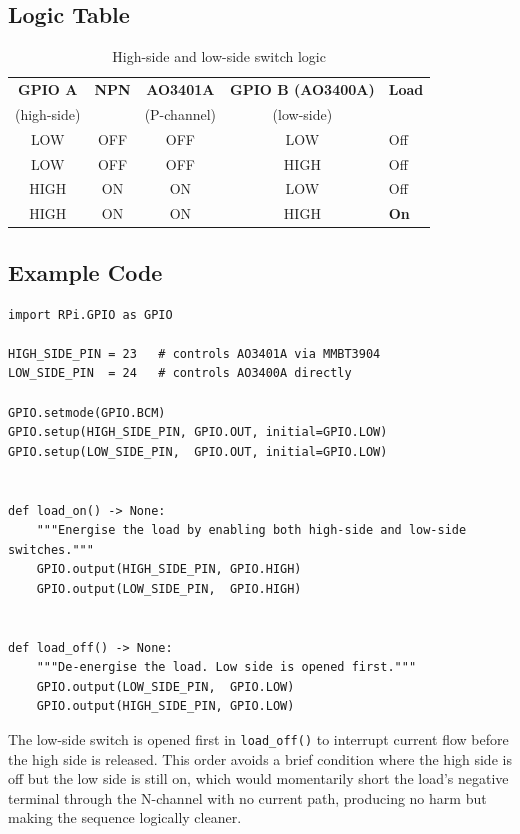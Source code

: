 \subsection{Logic Table}

\begin{table}[h]
\centering
\begin{tabular}{ccccl}
\hline
\textbf{GPIO A} & \textbf{NPN} & \textbf{AO3401A} & \textbf{GPIO B (AO3400A)} & \textbf{Load} \\
(high-side)     &              & (P-channel)      & (low-side)                &               \\
\hline
LOW  & OFF & OFF & LOW  & Off \\
LOW  & OFF & OFF & HIGH & Off \\
HIGH & ON  & ON  & LOW  & Off \\
HIGH & ON  & ON  & HIGH & \textbf{On} \\
\hline
\end{tabular}
\caption{High-side and low-side switch logic}
\label{tab:highside_logic}
\end{table}

\subsection{Example Code}

\begin{verbatim}
import RPi.GPIO as GPIO

HIGH_SIDE_PIN = 23   # controls AO3401A via MMBT3904
LOW_SIDE_PIN  = 24   # controls AO3400A directly

GPIO.setmode(GPIO.BCM)
GPIO.setup(HIGH_SIDE_PIN, GPIO.OUT, initial=GPIO.LOW)
GPIO.setup(LOW_SIDE_PIN,  GPIO.OUT, initial=GPIO.LOW)


def load_on() -> None:
    """Energise the load by enabling both high-side and low-side switches."""
    GPIO.output(HIGH_SIDE_PIN, GPIO.HIGH)
    GPIO.output(LOW_SIDE_PIN,  GPIO.HIGH)


def load_off() -> None:
    """De-energise the load. Low side is opened first."""
    GPIO.output(LOW_SIDE_PIN,  GPIO.LOW)
    GPIO.output(HIGH_SIDE_PIN, GPIO.LOW)
\end{verbatim}

\noindent The low-side switch is opened first in \texttt{load\_off()} to interrupt
current flow before the high side is released. This order avoids a brief condition
where the high side is off but the low side is still on, which would momentarily
short the load's negative terminal through the N-channel with no current path,
producing no harm but making the sequence logically cleaner.
